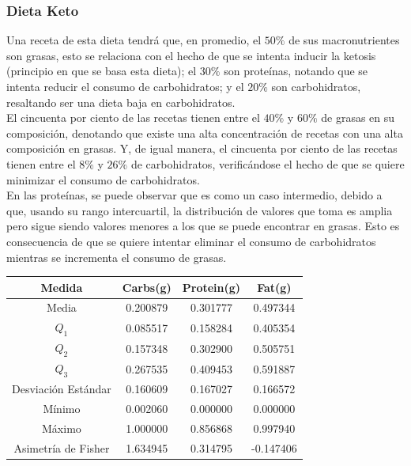 \documentclass[12pt,a4paper]{article}
\begin{document}
        \subsubsection{Dieta Keto}

            Una receta de esta dieta tendrá que, en promedio, el $50\%$ de 
            sus macronutrientes son grasas, esto se relaciona con el hecho de 
            que se intenta inducir la ketosis (principio en que se basa esta         
            dieta); el $30\%$ son proteínas, notando que se intenta reducir 
            el consumo de carbohidratos; y el $20\%$ son carbohidratos, 
            resaltando ser una dieta baja en carbohidratos.\\

            El cincuenta por ciento de las recetas tienen entre el $40\%$ y 
            $60\%$ de grasas en su composición, denotando que existe una alta 
            concentración de recetas con una alta composición en grasas. Y, de 
            igual manera, el cincuenta por ciento de las recetas tienen entre 
            el $8\%$ y $26\%$ de carbohidratos, verificándose el hecho de que 
            se quiere minimizar el consumo de carbohidratos.\\

            En las proteínas, se puede observar que es como un caso intermedio, 
            debido a que, usando su rango intercuartil, la distribución de valores 
            que toma es amplia pero sigue siendo valores menores a los que se puede 
            encontrar en grasas. Esto es consecuencia de que se quiere intentar 
            eliminar el consumo de carbohidratos mientras se incrementa el consumo 
            de grasas.

            \begin{center}
                \begin{tabular}{| c | c c c |}
                    \toprule
                    Medida & Carbs(g) & Protein(g) & Fat(g) \\
                    \midrule
                    Media               & 0.200879 & 0.301777 & 0.497344  \\
                    $Q_1$               & 0.085517 & 0.158284 & 0.405354  \\
                    $Q_2$               & 0.157348 & 0.302900 & 0.505751  \\
                    $Q_3$               & 0.267535 & 0.409453 & 0.591887  \\
                    Desviación Estándar & 0.160609 & 0.167027 & 0.166572  \\
                    Mínimo              & 0.002060 & 0.000000 & 0.000000  \\
                    Máximo              & 1.000000 & 0.856868 & 0.997940  \\
                    Asimetría de Fisher & 1.634945 & 0.314795 & -0.147406 \\
                    \bottomrule
                \end{tabular}
            \end{center}
\end{document}
